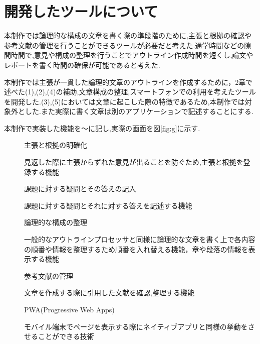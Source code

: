 \documentclass[twocolumn,10pt,a4j]{jsarticle}
\begin{document}
\section{開発したツールについて}
本制作では論理的な構成の文章を書く際の準段階のために,主張と根拠の確認や参考文献の管理を行うことができるツールが必要だと考えた.通学時間などの隙間時間で,意見や構成の整理を行うことでアウトライン作成時間を短くし,論文やレポートを書く時間の確保が可能であると考えた.

本制作では主張が一貫した論理的文章のアウトラインを作成するために，2章で述べた(1),(2),(4)の補助,文章構成の整理,スマートフォンでの利用を考えたツールを開発した.(3),(5)においては文章に起こした際の特徴であるため,本制作では対象外とした.また実際に書く文章は別のアプリケーションで記述することにする.

本制作で実装した機能を〜に記し,実際の画面を図\ref{fig:g}に示す.

\begin{comment}
一般的なアウトラインプロセッサと異なり,主張と根拠の明確化や,参考文献を管理することに主眼を置き,アカデミックライティングに沿った文章を作成,スマートフォンでの利用を考え以下の機能を持たせた.
\end{comment}

\begin{description}
  \item[]主張と根拠の明確化
  
 見返した際に主張からずれた意見が出ることを防ぐため,主張と根拠を登録する機能
  
  \item[]課題に対する疑問とその答えの記入
  
課題に対する疑問とそれに対する答えを記述する機能
  
  \item[]論理的な構成の整理
  
  一般的なアウトラインプロセッサと同様に論理的な文章を書く上で各内容の順番や情報を整理するため順番を入れ替える機能，章や段落の情報を表示する機能
  
  \item[]参考文献の管理
  
  文章を作成する際に引用した文献を確認,整理する機能 
  
  \item[]PWA(Progressive Web Apps)
  
  モバイル端末でページを表示する際にネイティブアプリと同様の挙動をさせることができる技術
\end{description}
\end{document}
